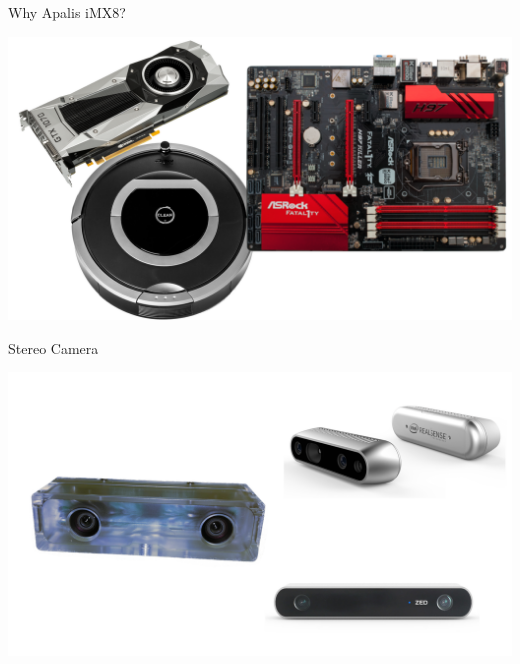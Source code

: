 \documentclass[aspectratio=169]{beamer}
\begin{document}
\note{
}

\begin{frame}{Why Apalis iMX8?}
  \begin{center}
    \includegraphics[height=0.9\textheight]{./img/robot_size.png}
  \end{center}
\end{frame}

\note{
}

\begin{frame}{Stereo Camera}
  \begin{center}
    \includegraphics[height=0.9\textheight]{./img/cameras.png}
  \end{center}
\end{frame}

\note{
}
\end{document}
